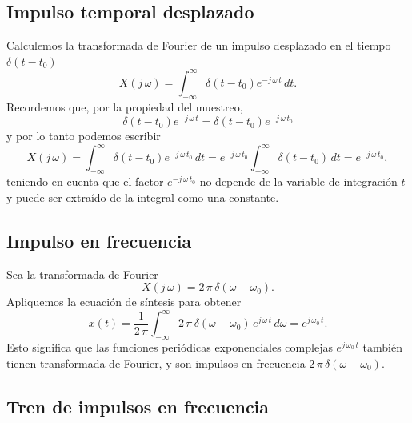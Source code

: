 \subsection{Impulso temporal desplazado}

Calculemos la transformada de Fourier de un impulso desplazado en el tiempo $\delta(t - t_{0})$
\begin{equation}
	X(j \, \omega) = \int_{-\infty}^{\infty} \delta(t - t_{0}) e^{-j \, \omega \, t} \, dt.
\end{equation}
Recordemos que, por la propiedad del muestreo,
\begin{equation}
	\delta(t - t_{0}) e^{-j \, \omega \, t} = \delta(t - t_{0}) e^{-j \, \omega \, t_{0}}
\end{equation}
y por lo tanto podemos escribir
\begin{equation}
	X(j \, \omega) = \int_{-\infty}^{\infty} \delta(t - t_{0}) e^{-j \, \omega \, t_{0}} \, dt = e^{-j \, \omega \, t_{0}} \int_{-\infty}^{\infty} \delta(t - t_0) \, dt = e^{-j \, \omega \, t_{0}},
\end{equation}
teniendo en cuenta que el factor $e^{-j \, \omega \, t_{0}}$ no depende de la variable de integración $t$ y puede ser extraído de la integral como una constante.

\subsection{Impulso en frecuencia}

Sea la transformada de Fourier 
\begin{equation}
	X(j \, \omega) = 2 \, \pi \, \delta(\omega - \omega_{0}) .
\end{equation}
Apliquemos la ecuación de síntesis para obtener 
\begin{equation}
	x(t) = \frac{1}{2 \, \pi} \int_{-\infty}^{\infty} 2 \, \pi \, \delta(\omega - \omega_{0}) \, e^{j \, \omega \, t} \, d\omega = e^{j \, \omega_{0} \, t}.
\end{equation}
Esto significa que las funciones periódicas exponenciales complejas $e^{j \, \omega_{0} \, t}$ también tienen transformada de Fourier, y son impulsos en frecuencia $2 \, \pi \, \delta(\omega - \omega_{0})$.

\subsection{Tren de impulsos en frecuencia}

